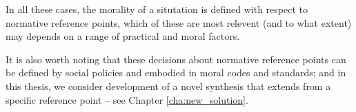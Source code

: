 
In all these cases, the morality of a situtation is defined with respect to normative reference points, which of these are most relevent (and to what extent) may depends on a range of practical and moral factors.

It is also worth noting that these decisions about normative reference points can be defined by social policies %
 and embodied in moral codes and standards; and in this thesis, we consider development of a novel synthesis that extends from a specific reference point -- see Chapter \ref{cha:new_solution}. 





